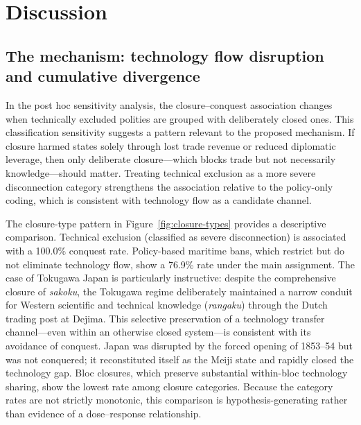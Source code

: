 \documentclass[pdflatex,sn-basic]{sn-jnl}
\theoremstyle{thmstyleone}%
\theoremstyle{thmstyletwo}%
\theoremstyle{thmstylethree}%
\begin{document}
\section{Discussion}\label{sec:discussion}

\subsection{The mechanism: technology flow disruption and cumulative divergence}\label{sec:disc-mechanism}

In the post hoc sensitivity analysis, the closure--conquest association changes when technically excluded polities are grouped with deliberately closed ones. This classification sensitivity suggests a pattern relevant to the proposed mechanism. If closure harmed states solely through lost trade revenue or reduced diplomatic leverage, then only deliberate closure---which blocks trade but not necessarily knowledge---should matter. Treating technical exclusion as a more severe disconnection category strengthens the association relative to the policy-only coding, which is consistent with technology flow as a candidate channel.

The closure-type pattern in Figure~\ref{fig:closure-types} provides a descriptive comparison. Technical exclusion (classified as severe disconnection) is associated with a 100.0\% conquest rate. Policy-based maritime bans, which restrict but do not eliminate technology flow, show a 76.9\% rate under the main assignment. The case of Tokugawa Japan is particularly instructive: despite the comprehensive closure of \emph{sakoku}, the Tokugawa regime deliberately maintained a narrow conduit for Western scientific and technical knowledge (\emph{rangaku}) through the Dutch trading post at Dejima. This selective preservation of a technology transfer channel---even within an otherwise closed system---is consistent with its avoidance of conquest. Japan was disrupted by the forced opening of 1853--54 but was not conquered; it reconstituted itself as the Meiji state and rapidly closed the technology gap. Bloc closures, which preserve substantial within-bloc technology sharing, show the lowest rate among closure categories. Because the category rates are not strictly monotonic, this comparison is hypothesis-generating rather than evidence of a dose--response relationship.
\end{document}
